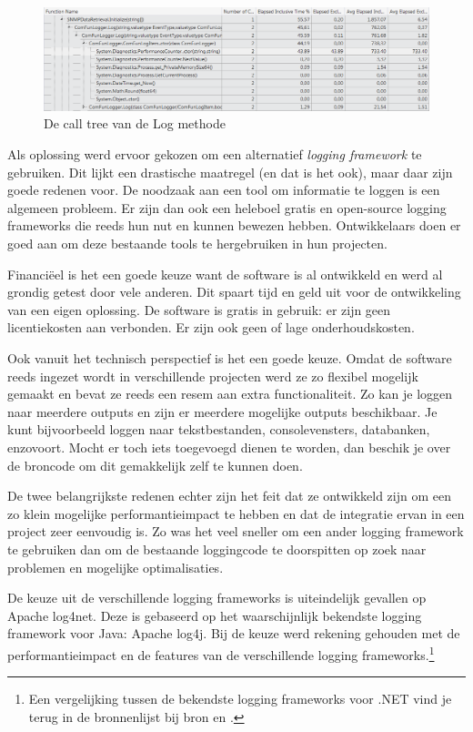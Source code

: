 \begin{figure}[h]
	\centering
	\includegraphics[scale=0.50]{figures/profiler/call-tree-performancecounter}
	\caption{De call tree van de Log methode}
	\label{call-tree-performancecounter}
\end{figure}


Als oplossing werd ervoor gekozen om een alternatief \emph{logging framework} te gebruiken.
Dit lijkt een drastische maatregel (en dat is het ook), maar daar zijn goede redenen voor.
De noodzaak aan een tool om informatie te loggen is een algemeen probleem.
Er zijn dan ook een heleboel gratis en open-source logging frameworks die reeds hun nut en kunnen bewezen hebben.
Ontwikkelaars doen er goed aan om deze bestaande tools te hergebruiken in hun projecten.

Financiëel is het een goede keuze want de software is al ontwikkeld en werd al grondig getest door vele anderen.
Dit spaart tijd en geld uit voor de ontwikkeling van een eigen oplossing.
De software is gratis in gebruik: er zijn geen licentiekosten aan verbonden.
Er zijn ook geen of lage onderhoudskosten.

Ook vanuit het technisch perspectief is het een goede keuze.
Omdat de software reeds ingezet wordt in verschillende projecten werd ze zo flexibel mogelijk gemaakt en bevat ze reeds een resem aan extra functionaliteit.
Zo kan je loggen naar meerdere outputs en zijn er meerdere mogelijke outputs beschikbaar.
Je kunt bijvoorbeeld loggen naar tekstbestanden, consolevensters, databanken, enzovoort.
Mocht er toch iets toegevoegd dienen te worden, dan beschik je over de broncode om dit gemakkelijk zelf te kunnen doen.

De twee belangrijkste redenen echter zijn het feit dat ze ontwikkeld zijn om een zo klein mogelijke performantieimpact te hebben en
dat de integratie ervan in een project zeer eenvoudig is.
Zo was het veel sneller om een ander logging framework te gebruiken dan om de bestaande loggingcode te doorspitten op zoek naar problemen en mogelijke optimalisaties.

De keuze uit de verschillende logging frameworks is uiteindelijk gevallen op Apache log4net.
Deze is gebaseerd op het waarschijnlijk bekendste logging framework voor Java: Apache log4j.
Bij de keuze werd rekening gehouden met de performantieimpact en de features van de verschillende logging frameworks.\footnote{
	Een vergelijking tussen de bekendste logging frameworks voor .NET vind je 
	terug in de bronnenlijst bij bron \cite{logging-frameworks-and-performance} en \cite{logging-frameworks}.
}

